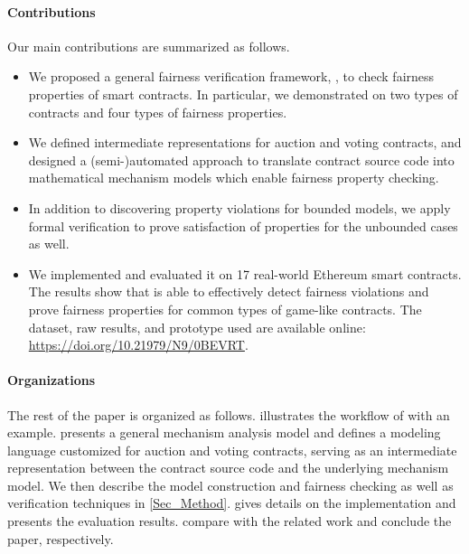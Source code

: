 \paragraph{Contributions}
Our main contributions are summarized as follows.
\begin{itemize}[leftmargin=*,topsep=4pt]
	\item We proposed a general fairness verification framework, \faircon, to check fairness properties of
	smart contracts.
	In particular, we demonstrated \faircon on two types of contracts and four types of fairness
	properties.
	\item We defined intermediate representations for auction and voting contracts, and designed a
	(semi-)automated approach to translate contract source code into mathematical mechanism models
	which enable fairness property checking.
	\item In addition to discovering property violations for bounded models, we apply formal
	verification to prove satisfaction of properties for the unbounded cases as well.
	\item We implemented \faircon and evaluated it on 17 real-world Ethereum smart contracts.
	The results show that \faircon is able to effectively detect fairness violations and prove fairness
	properties for common types of game-like contracts.
	The dataset, raw results, and prototype used are available online:
	\url{https://doi.org/10.21979/N9/0BEVRT}.
\end{itemize}

\paragraph{Organizations}
The rest of the paper is organized as follows.
 illustrates the workflow of \faircon with an example.
 presents a general mechanism analysis model and defines a
modeling language customized for auction and voting contracts, serving as an intermediate
representation between the contract source code and the underlying mechanism model.
We then describe the model construction and fairness checking as well as verification techniques in
\cref{Sec_Method}.
 gives details on the implementation and presents the evaluation results.
 compare \faircon with the related work and
conclude the paper, respectively.



